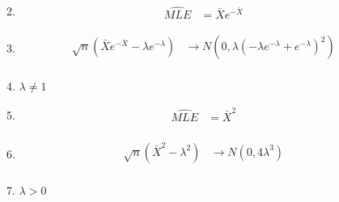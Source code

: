 \documentclass{article}
\begin{document}
\begin{enumerate}
\begin{enumerate}
\begin{equation*}
		\end{equation*}
	\item
		\begin{equation*}
		\begin{split}
		\hat{MLE} & = \bar{X}e^{-\bar{X}}
		\end{split}
		\end{equation*}
	\item
		\begin{equation*}
		\begin{split}
		\sqrt{n} (\bar{X}e^{-\bar{X}} - \lambda e^{-\lambda}) &  \rightarrow N(0,\lambda(-\lambda e^{-\lambda}+e^{-\lambda})^{2} )\\
		\end{split}
		\end{equation*}
	\item
	$\lambda \neq 1$
	\item
		\begin{equation*}
		\begin{split}
		\hat{MLE} & = \bar{X}^{2} \\
		\end{split}
		\end{equation*}
	\item
		\begin{equation*}
		\begin{split}
		\sqrt{n} (\bar{X}^{2} - \lambda^{2}) &  \rightarrow N(0, 4 \lambda ^{3})\\
		\end{split}
		\end{equation*}
	\item
	$\lambda > 0 $
	\end{enumerate}
\end{enumerate}
\end{document}
